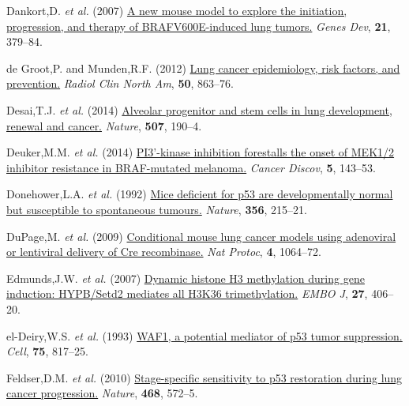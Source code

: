 \begin{CSLReferences}{1}{0}
\leavevmode{}%
Dankort,D. \emph{et al.} (2007) \href{https://doi.org/10.1101/gad.1516407}{A new mouse model to explore the initiation, progression, and therapy of BRAFV600E-induced lung tumors.} \emph{Genes Dev}, \textbf{21}, 379--84.

\leavevmode{}%
de Groot,P. and Munden,R.F. (2012) \href{https://doi.org/10.1016/j.rcl.2012.06.006}{Lung cancer epidemiology, risk factors, and prevention.} \emph{Radiol Clin North Am}, \textbf{50}, 863--76.

\leavevmode{}%
Desai,T.J. \emph{et al.} (2014) \href{https://doi.org/10.1038/nature12930}{Alveolar progenitor and stem cells in lung development, renewal and cancer.} \emph{Nature}, \textbf{507}, 190--4.

\leavevmode{}%
Deuker,M.M. \emph{et al.} (2014) \href{https://doi.org/10.1158/2159-8290.cd-14-0856}{PI3'-kinase inhibition forestalls the onset of MEK1/2 inhibitor resistance in BRAF-mutated melanoma.} \emph{Cancer Discov}, \textbf{5}, 143--53.

\leavevmode{}%
Donehower,L.A. \emph{et al.} (1992) \href{https://doi.org/10.1038/356215a0}{Mice deficient for p53 are developmentally normal but susceptible to spontaneous tumours.} \emph{Nature}, \textbf{356}, 215--21.

\leavevmode{}%
DuPage,M. \emph{et al.} (2009) \href{https://doi.org/10.1038/nprot.2009.95}{Conditional mouse lung cancer models using adenoviral or lentiviral delivery of Cre recombinase.} \emph{Nat Protoc}, \textbf{4}, 1064--72.

\leavevmode{}%
Edmunds,J.W. \emph{et al.} (2007) \href{https://doi.org/10.1038/sj.emboj.7601967}{Dynamic histone H3 methylation during gene induction: HYPB/Setd2 mediates all H3K36 trimethylation.} \emph{EMBO J}, \textbf{27}, 406--20.

\leavevmode{}%
el-Deiry,W.S. \emph{et al.} (1993) \href{https://doi.org/10.1016/0092-8674(93)90500-p}{WAF1, a potential mediator of p53 tumor suppression.} \emph{Cell}, \textbf{75}, 817--25.

\leavevmode{}%
Feldser,D.M. \emph{et al.} (2010) \href{https://doi.org/10.1038/nature09535}{Stage-specific sensitivity to p53 restoration during lung cancer progression.} \emph{Nature}, \textbf{468}, 572--5.


\end{CSLReferences}
